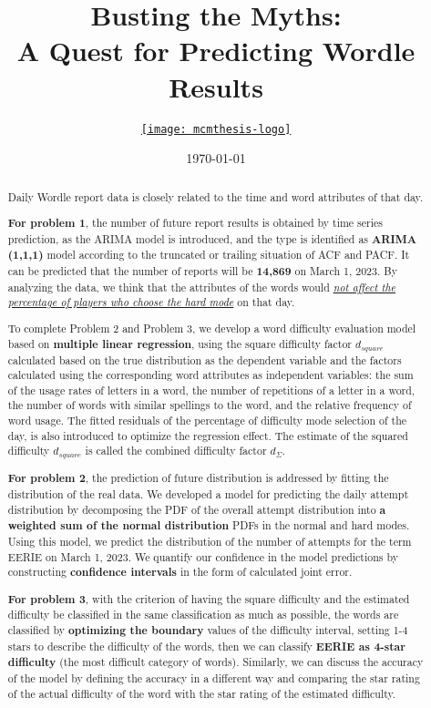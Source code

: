\documentclass[12pt]{mcmthesis}
\title{\textbf{Busting the Myths:\\A Quest for Predicting Wordle Results}}
\author{\small \href{https://www.latexstudio.net/}
  {\texttt{[image: mcmthesis-logo]}}}
\date{\today}
\begin{document}
\begin{abstract}
\hspace{1.4em}Daily Wordle report data is closely related to the time and word attributes of that day.

\textbf{For problem 1}, the number of future report results is obtained by time series prediction, as the ARIMA model is introduced, and the type is identified as \textbf{ARIMA (1,1,1)} model according to the truncated or trailing situation of ACF and PACF. It can be predicted that the number of reports will be \textbf{14,869} on March 1, 2023. By analyzing the data, we think that the attributes of the words would \underline{\textit{not affect the percentage of players who choose the hard mode}} on that day.

To complete Problem 2 and Problem 3, we develop a word difficulty evaluation model based on \textbf{multiple linear regression}, using the square difficulty factor $ d_{square} $ calculated based on the true distribution as the dependent variable and the factors calculated using the corresponding word attributes as independent variables: the sum of the usage rates of letters in a word, the number of repetitions of a letter in a word, the number of words with similar spellings to the word, and the relative frequency of word usage. The fitted residuals of the percentage of difficulty mode selection of the day, is also introduced to optimize the regression effect. The estimate of the squared difficulty $ d_{square} $ is called the combined difficulty factor $ d_{\varSigma} $.

\textbf{For problem 2}, the prediction of future distribution is addressed by fitting the distribution of the real data. We developed a model for predicting the daily attempt distribution by decomposing the PDF of the overall attempt distribution into\textbf{ a weighted sum of the normal distribution} PDFs in the normal and hard modes. Using this model, we predict the distribution of the number of attempts for the term EERIE on March 1, 2023. We quantify our confidence in the model predictions by constructing \textbf{confidence intervals} in the form of calculated joint error.

\textbf{For problem 3}, with the criterion of having the square difficulty and the estimated difficulty be classified in the same classification as much as possible, the words are classified by \textbf{optimizing the boundary} values of the difficulty interval, setting 1-4 stars to describe the difficulty of the words, then we can classify \textbf{EERIE as 4-star difficulty} (the most difficult category of words). Similarly, we can discuss the accuracy of the model by defining the accuracy in a different way and comparing the star rating of the actual difficulty of the word with the star rating of the estimated difficulty.


\end{abstract}
\end{document}

